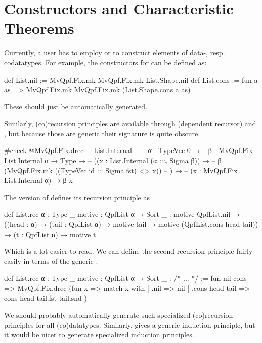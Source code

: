 \section{Constructors and Characteristic Theorems}

Currently, a user has to employ  or  to construct elements
of data-, resp. codatatypes. For example, the constructors for  can be defined as:
\begin{leancode}
  def List.nil := MvQpf.Fix.mk MvQpf.Fix.mk List.Shape.nil
  def List.cons := 
    fun a as => MvQpf.Fix.mk MvQpf.Fix.mk (List.Shape.cons a as)
\end{leancode}
These should just be automatically generated.


Similarly, (co)recursion principles are available through  (dependent recursor) 
and , but because those are generic their signature is quite obscure.
\begin{leancode}
  #check @MvQpf.Fix.drec _ List.Internal _
  -- {α : TypeVec 0} →
  --   {β : MvQpf.Fix List.Internal α → Type} →
  --     ((x : List.Internal (α :::ᵥ Sigma β)) → 
  --        β (MvQpf.Fix.mk ((TypeVec.id ::: Sigma.fst) <$$> x))
  --     ) →
  --       (x : MvQpf.Fix List.Internal α) → β x
\end{leancode}

The \inductive{} version of  defines its recursion principle as
\begin{leancode}
  def List.rec {α : Type _} {motive : QpfList α → Sort _} :
  motive QpfList.nil 
    → ((head : α) → (tail : QpfList α) → motive tail → motive (QpfList.cons head tail))
    → (t : QpfList α) 
    → motive t
\end{leancode}

Which is a lot easier to read.
We can define the second recursion principle fairly easily in terms of the generic .
\begin{leancode}
  def List.rec {α : Type _} {motive : QpfList α → Sort _} : /* ... */ :=
    fun nil cons => MvQpf.Fix.drec (fun x => 
      match x with
      | .nil            => nil
      | .cons head tail => cons head tail.fst tail.snd
    )
\end{leancode}

We should probably automatically generate such specialized (co)recursion principles for all (co)datatypes.
Similarly,  gives a generic induction principle, but it would be nicer to generate
specialized induction principles.


